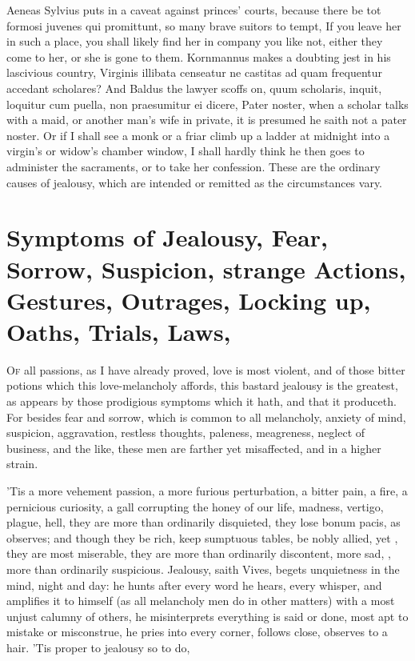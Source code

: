 Aeneas Sylvius puts in a caveat against princes' courts, because there
be tot formosi juvenes qui promittunt, so many brave suitors to tempt,
\etc{} If you leave her in such a place, you shall likely find her
in company you like not, either they come to her, or she is gone to
them. Kornmannus makes a doubting jest in his lascivious country,
Virginis illibata censeatur ne castitas ad quam frequentur accedant
scholares? And Baldus the lawyer scoffs on, quum scholaris, inquit,
loquitur cum puella, non praesumitur ei dicere, Pater noster, when a
scholar talks with a maid, or another man's wife in private, it is
presumed he saith not a pater noster. Or if I shall see a monk or a
friar climb up a ladder at midnight into a virgin's or widow's chamber
window, I shall hardly think he then goes to administer the sacraments,
or to take her confession. These are the ordinary causes of jealousy,
which are intended or remitted as the circumstances vary.


\section[Symptoms of Jealousy]{Symptoms of Jealousy, Fear, Sorrow, Suspicion, strange Actions, Gestures, Outrages, Locking up, Oaths, Trials, Laws, \etc{}}

\lettrine{O}{f} all passions, as I have already proved, love is most violent, and of
those bitter potions which this love-melancholy affords, this bastard
jealousy is the greatest, as appears by those prodigious symptoms which
it hath, and that it produceth. For besides fear and sorrow, which is
common to all melancholy, anxiety of mind, suspicion, aggravation,
restless thoughts, paleness, meagreness, neglect of business, and the
like, these men are farther yet misaffected, and in a higher strain.

'Tis a more vehement passion, a more furious perturbation, a bitter
pain, a fire, a pernicious curiosity, a gall corrupting the honey of
our life, madness, vertigo, plague, hell, they are more than ordinarily
disquieted, they lose bonum pacis, as \Chrysostom{} observes; and
though they be rich, keep sumptuous tables, be nobly allied, yet
, they are most miserable, they are more than
ordinarily discontent, more sad, , more than ordinarily
suspicious. Jealousy, saith Vives, begets unquietness in the
mind, night and day: he hunts after every word he hears, every whisper,
and amplifies it to himself (as all melancholy men do in other matters)
with a most unjust calumny of others, he misinterprets everything is
said or done, most apt to mistake or misconstrue, he pries into every
corner, follows close, observes to a hair. 'Tis proper to jealousy so
to do,

